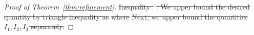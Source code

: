 \documentclass[lettersize,onecolumn,journal]{IEEEtran}
\theoremstyle{definition}
\theoremstyle{definition}
\newcommand{\of}[1]{\left(#1\right)}
\providecommand{\DIFdeltex}[1]{{\protect\color{red}\sout{#1}}}                      %
\providecommand{\DIFdel}[1]{\texorpdfstring{\DIFdeltex{#1}}{}} %
\begin{document}
\begin{proof}[Proof of Theorem~\ref{thm:refinement}]
\DIFdel{Inequality~}%
\DIFdel{. We upper bound the desired quantity by triangle inequality as
    }%
\DIFdel{where 
    }%
\DIFdel{Next, we upper bound the quantities $I_1, I_2, I_3$ separately. 
    }%


\end{proof}
\end{document}

